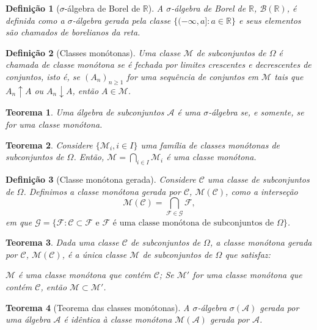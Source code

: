 \documentclass[12pt,a4paper,answers]{article}
\numberwithin{equation}{section} %
\renewcommand{\Re}{\mathbb{R}}
\newcommand{\Bo}{\mathcal{B}(\Re)} 				%
\newcommand{\Acal}{\mathcal{A}}
\newcommand{\Ccal}{\mathcal{C}}
\newcommand{\Fcal}{\mathcal{F}}
\newcommand{\Gcal}{\mathcal{G}}
\newcommand{\Mcal}{\mathcal{M}}
\theoremstyle{thm_estilo}
\newtheorem{theorem}{Teorema}[section]
\newtheorem{definition}{Definição}[section]
\theoremstyle{thm_note_est}
\begin{document}
\begin{definition}[$\sigma$-álgebra de Borel de $\Re$]
	A $\sigma$-álgebra de Borel de $\Re$, $\Bo$, é definida como a $\sigma$-álgebra gerada pela classe $\{(-\infty, a] : a \in \Re\}$ e seus elementos são chamados de borelianos da reta.
\end{definition}

\begin{definition}[Classes monótonas]
	Uma classe $\Mcal$ de subconjuntos de $\Omega$ é chamada de classe monótona se é fechada por limites crescentes e decrescentes de conjuntos, isto é, se $(A_n)_{n\geq 1}$ for uma sequência de conjuntos em $\Mcal$ tais que $A_n \uparrow A$ ou $A_n \downarrow A$, então $A \in \Mcal$.
\end{definition}

\begin{theorem}
	Uma álgebra de subconjuntos $\Acal$ é uma $\sigma$-álgebra se, e somente, se for uma classe monótona.
\end{theorem}

\begin{theorem}
	Considere $\{\Mcal_i, i \in I\}$ uma família de classes monótonas de subconjuntos de $\Omega$. Então, $\Mcal = \bigcap_{i \in I} \Mcal_i$ é uma classe monótona.
\end{theorem}

\begin{definition}[Classe monótona gerada]
	Considere $\Ccal$ uma classe de subconjuntos de $\Omega$. Definimos a classe monótona gerada por $\Ccal$, $\Mcal(\Ccal)$, como a interseção
	\[
	\Mcal(\Ccal) = \bigcap_{\Fcal \in \Gcal} \Fcal,
	\]
	em que $\Gcal = \{\Fcal : \Ccal \subset \Fcal \text{ e } \Fcal \text{ é uma classe monótona de subconjuntos de } \Omega\}$.
\end{definition}

\begin{theorem}
	Dada uma classe $\Ccal$ de subconjuntos de $\Omega$, a classe monótona gerada por $\Ccal$, $\Mcal(\Ccal)$, é a única classe $\Mcal$ de subconjuntos de $\Omega$ que satisfaz:
	\begin{outline}[enumerate]
		\1 $\Mcal$ é uma classe monótona que contém $\Ccal$;
		\1 Se $\Mcal'$ for uma classe monótona que contém $\Ccal$, então $\Mcal \subset \Mcal'$.
	\end{outline}
\end{theorem}

\begin{theorem}[Teorema das classes monótonas]
	A $\sigma$-álgebra $\sigma(\Acal)$ gerada por uma álgebra $\Acal$ é idêntica à classe monótona $\Mcal(\Acal)$ gerada por $\Acal$.
\end{theorem}
\end{document}
